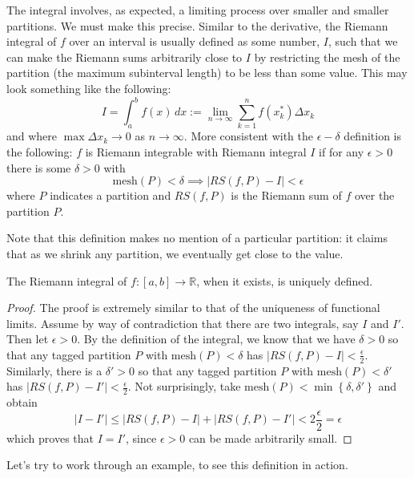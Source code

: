 The integral involves, as expected, a limiting process over smaller and smaller partitions. We must make this precise. Similar to the derivative, the Riemann integral of $f$ over an interval is usually defined as some number, $I$, such that we can make the Riemann sums arbitrarily close to $I$ by restricting the mesh of the partition (the maximum subinterval length) to be less than some value. This may look something like the following: $$ I = \int_a^b f\left(x\right)\, dx := \lim_{n\rightarrow \infty} \sum_{k=1}^n f\left(x_k^*\right) \Delta x_k $$ and where $\max \Delta x_k \rightarrow 0$ as $n\rightarrow \infty$.  More consistent with the $\epsilon-\delta$ definition is the following: $f$ is Riemann integrable with Riemann integral $I$ if for any $\epsilon >0$ there is some $\delta >0$ with $$ \text{mesh}\left(P\right) < \delta \implies \left| RS\left(f,P\right) - I\right| < \epsilon $$ where $P$ indicates a partition and $RS\left(f,P\right)$ is the Riemann sum of $f$ over the partition $P$.


Note that this definition makes no mention of a particular partition: it claims that as we shrink any partition, we eventually get close to the value.

\begin{prop}
The Riemann integral of $f:\left[a,b\right]\rightarrow \mathbb{R}$, when it exists, is uniquely defined.
\end{prop}
\begin{proof}
The proof is extremely similar to that of the uniqueness of functional limits. Assume by way of contradiction that there are two integrals, say $I$ and $I'$. Then let $\epsilon>0$. By the definition of the integral, we know that we have $\delta >0$ so that any tagged partition $P$ with $\text{mesh}\left(P\right) < \delta$ has $\left|RS\left(f,P\right)-I\right| < \frac{\epsilon}{2}$. Similarly, there is a $\delta' >0$ so that any tagged partition $P$ with $\text{mesh}\left(P\right) < \delta'$ has $\left|RS\left(f,P\right)-I'\right| < \frac{\epsilon}{2}$. Not surprisingly, take $\text{mesh}\left(P\right) < \min\left\{\delta,\delta'\right\}$ and obtain  $$ \left| I-I'\right| \leq \left| RS\left(f,P\right)-I\right| + \left|RS\left(f,P\right)-I'\right| < 2\frac{\epsilon}{2} = \epsilon $$ which proves that $I=I'$, since $\epsilon>0$ can be made arbitrarily small.
\end{proof}

Let's try to work through an example, to see this definition in action.



